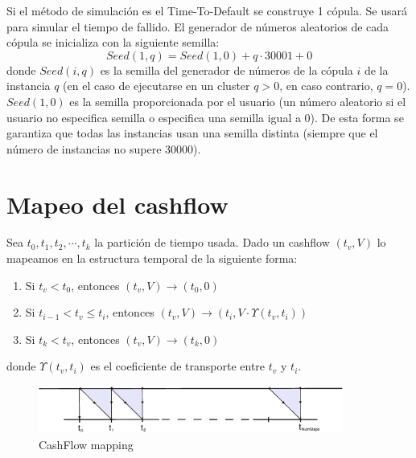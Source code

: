 Si el m\'etodo de simulaci\'on es el Time-To-Default se construye
1 c\'opula. Se usar\'a para simular el tiempo de fallido.
\newline
\newline
El generador de n\'umeros aleatorios de cada c\'opula se
inicializa con la siguiente semilla:
\begin{displaymath}
Seed(1,q) = Seed(1,0) + q \cdot 30001 + 0
\end{displaymath}
donde $Seed(i,q)$ es la semilla del generador de n\'umeros de la
c\'opula $i$ de la instancia $q$ (en el caso de ejecutarse en un
cluster $q>0$, en caso contrario, $q=0$). $Seed(1,0)$ es la semilla
proporcionada por el usuario (un n\'umero aleatorio si el usuario no
especifica semilla o especifica una semilla igual a 0). De esta
forma se garantiza que todas las instancias usan una semilla distinta
(siempre que el n\'umero de instancias no supere 30000).


\section{Mapeo del cashflow}

Sea $t_0, t_1, t_2, \cdots, t_k$ la partici\'on de tiempo usada.
Dado un cashflow $(t_v,V)$ lo mapeamos en la estructura
temporal de la siguiente forma:

\begin{enumerate}
\item Si $t_v < t_0$, entonces $(t_v,V) \longrightarrow (t_0,0)$
\item Si $t_{i-1} < t_v \leq t_i$, entonces $(t_v,V) \longrightarrow (t_i,V \cdot \Upsilon(t_v,t_i))$
\item Si $t_k < t_v$, entonces $(t_v,V) \longrightarrow (t_k,0)$
\end{enumerate}

donde $\Upsilon(t_v,t_i)$ es el coeficiente de transporte entre $t_v$ y $t_i$.

\begin{figure}[!hb]
\begin{center}
\includegraphics[width=10cm,angle=0]{./images/cashflowmapping.eps}
\caption{CashFlow mapping}
\label{timetranches}
\end{center}
\end{figure}

